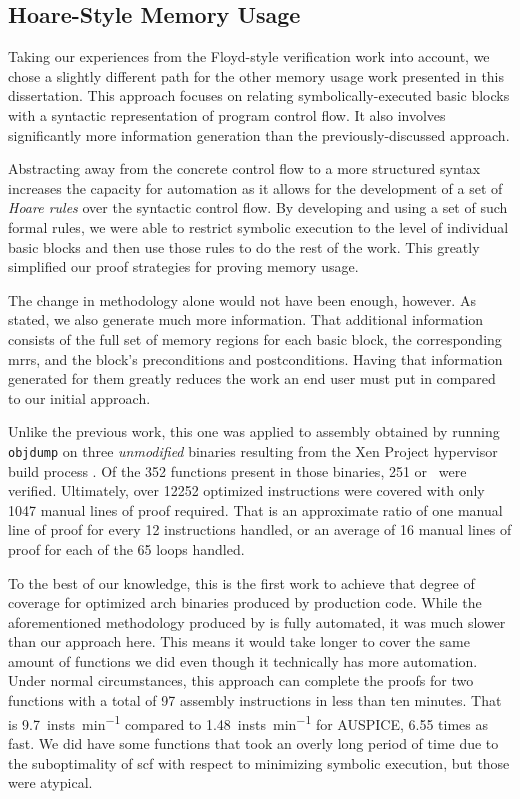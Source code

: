\subsection{Hoare-Style Memory Usage}
Taking our experiences from the Floyd-style verification work into account, we chose a slightly different path for the other memory usage work presented in this dissertation.
This approach focuses on relating symbolically-executed basic blocks with a syntactic representation of program control flow.
It also involves significantly more information generation than the previously-discussed approach.

Abstracting away from the concrete control flow to a more structured syntax increases the capacity for automation as it allows for the development of a set of \emph{Hoare rules} \autocite{hoare1969axiomatic} over the syntactic control flow.
By developing and using a set of such formal rules, we were able to restrict symbolic execution to the level of individual basic blocks and then use those rules to do the rest of the work.
This greatly simplified our proof strategies for proving memory usage.

The change in methodology alone would not have been enough, however.
As stated, we also generate much more information.
That additional information consists of the full set of memory regions for each basic block, the corresponding \acp{mrr}, and the block's preconditions and postconditions.
Having that information generated for them greatly reduces the work an end user must put in compared to our initial approach.

Unlike the previous work, this one was applied to assembly obtained by running \texttt{objdump} on three \emph{unmodified} binaries resulting from the Xen Project hypervisor build process \autocite{chisnall2008definitive}.
Of the \num{352} functions present in those binaries, \num{251} or \xenpercentage\ were verified.
Ultimately, over \num{12252} optimized instructions were covered with only \num{1047} manual lines of proof required.
That is an approximate ratio of one manual line of proof for every \num{12} instructions handled, or an average of \num{16} manual lines of proof for each of the \num{65} loops handled.

To the best of our knowledge, this is the first work to achieve that degree of coverage for optimized \gls{arch} binaries produced by production code.
While the aforementioned methodology produced by \textcite{tan2015auspice} is fully automated, it was much slower than our approach here.
This means it would take longer to cover the same amount of functions we did even though it technically has more automation.
Under normal circumstances, this approach can complete the proofs for two functions with a total of \num{97} assembly instructions in less than ten minutes.
That is \SI{9.7}{insts\per\minute} compared to \SI{1.48}{insts\per\minute} for AUSPICE, \num{6.55} times as fast.
We did have some functions that took an overly long period of time due to the suboptimality of \acl*{scf} with respect to minimizing symbolic execution, but those were atypical.

